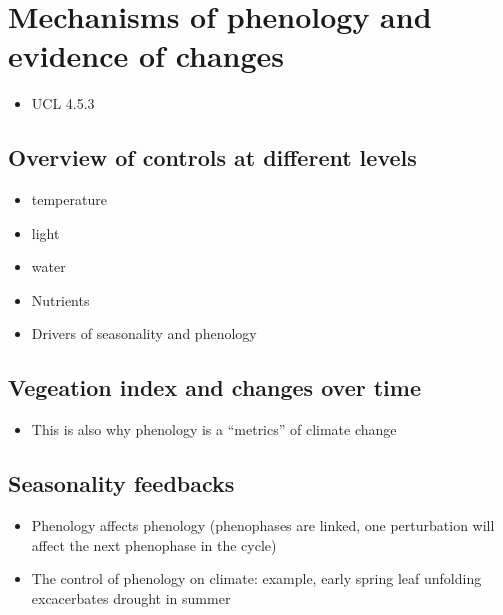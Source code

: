 \documentclass[12pt,oneside]{book}
\providecommand{\tightlist}{%
  \setlength{\itemsep}{0pt}\setlength{\parskip}{0pt}}
\begin{document}
\section{Mechanisms of phenology and evidence of
changes}\label{mechanisms-of-phenology-and-evidence-of-changes}

\begin{itemize}
\tightlist
\item
  UCL 4.5.3
\end{itemize}

\subsection{Overview of controls at different
levels}\label{overview-of-controls-at-different-levels}

\begin{itemize}
\tightlist
\item
  temperature
\item
  light
\item
  water
\item
  Nutrients
\item
  Drivers of seasonality and phenology
\end{itemize}

\subsection{Vegeation index and changes over
time}\label{vegeation-index-and-changes-over-time}

\begin{itemize}
\tightlist
\item
  This is also why phenology is a ``metrics'' of climate change
\end{itemize}

\subsection{Seasonality feedbacks}\label{seasonality-feedbacks}

\begin{itemize}
\tightlist
\item
  Phenology affects phenology (phenophases are linked, one perturbation
  will affect the next phenophase in the cycle)
\item
  The control of phenology on climate: example, early spring leaf
  unfolding excacerbates drought in summer
\end{itemize}
\end{document}
